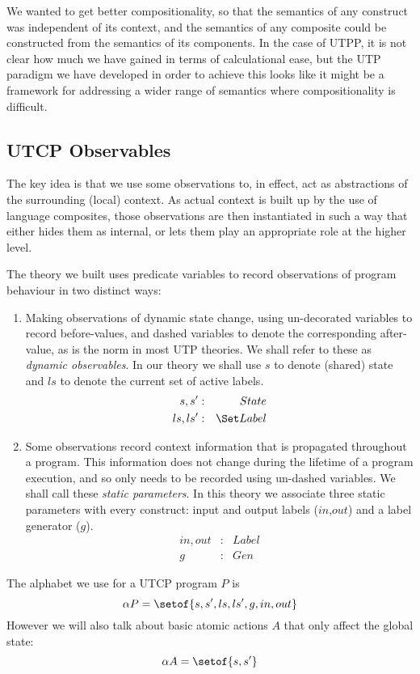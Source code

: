 We wanted to get better compositionality, so that the semantics of any construct was independent of its context,
and the semantics of any composite could be constructed from
the semantics of its components.
In the case of UTPP, it is not clear how much we have gained in terms
of calculational ease, but the UTP paradigm we have developed in order to
achieve this looks like it might be a framework for addressing a wider range of semantics where compositionality is difficult.



\subsection{UTCP Observables}

The key idea is that we use some observations to,
in effect, act as abstractions of the surrounding (local) context.
As actual context is built up by the use of language composites,
those observations are then instantiated in such a way
that either hides them as internal,
or lets them play an appropriate role at the higher level.

The theory we built uses predicate variables
to record observations of program behaviour
in two distinct ways:
\begin{enumerate}
  \item
    Making observations of dynamic state change,
    using un-decorated variables to record before-values,
    and dashed variables to denote the corresponding after-value,
    as is the norm in most UTP theories.
    We shall refer to these as \emph{dynamic observables}.
    In our theory we shall use $s$ to denote (shared) state
    and $ls$ to denote the current set of active labels.
    \begin{eqnarray*}
       s,s' &:& State
    \\ ls,ls' &:& \Set Label
    \end{eqnarray*}
  \item
    Some observations record context information that
    is propagated throughout a program.
    This information does not change during the lifetime of a program execution,
    and so only needs to be recorded using un-dashed variables.
    We shall call these \emph{static parameters}.
    In this theory we associate three static parameters with every construct: input and output labels ($in$,$out$)
    and a label generator ($g$).
    \begin{eqnarray*}
       in, out &:& Label
    \\ g &:& Gen
    \end{eqnarray*}
\end{enumerate}
The alphabet we use for a UTCP program $P$  is
\begin{equation*}
  \alpha P = \setof{s,s',ls,ls',g,in,out}
\end{equation*}
However we will also talk about basic atomic actions $A$
that only affect the global state:
\begin{equation*}
  \alpha A = \setof{s,s'}
\end{equation*}

